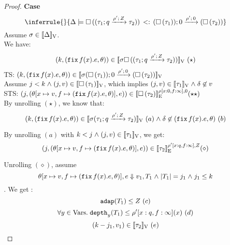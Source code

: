 \begin{proof}



\textbf{Case}
\[
\inferrule{
    }{
       \Delta \models \sub{\tbox{(
          \tarr{\type_1}{\type_2}{\nnatbiA}{\dmap'}{\nnatA} )} 
      }{\tarr{(\tbox{\type_1}) }{(\tbox{\type_2})}{0}{\dmap'}{0} }
    }
\]
Assume $ \ienv \in \lrv{\Delta}$.\\
We have:  $$ (\stepiA, (\efix f(x).\expr, \env) ) \in \lrv{\ienv \tbox{(
          \tarr{\type_1}{\type_2}{\nnatbiA}{\dmap'}{\nnatA} )} }
      ~(\star)$$
TS: $ (\stepiA, (\efix f(x).\expr, \env) ) \in \lrv{ \ienv 
  \tarr{(\tbox{\type_1}) }{(\tbox{\type_2})}{0}{\dmap'}{0}} $ \\
Assume $\stepiB < \stepiA \conj (j, \valr) \in \lrv{\tbox{\type_1}}$,
which implies $ (j, \valr) \in \lrv{\type_1} \conj \delta \not \in \valr$ \\
STS: $(\stepiB, (\env[x \mapsto \valr, f \mapsto (\efix f(x).\expr,
\env)], \expr)) \in \lre{\dmap[x: 0, f:
  \infty]}{0}{ \tbox{ \type_2} } (\star\star)$\\

By unrolling $(\star)$, we know that: 
 $$ (\stepiA, (\efix f(x).\expr, \env) ) \in \lrv{\ienv (
          \tarr{\type_1}{\type_2}{\nnatbiA}{\dmap'}{\nnatA} ) } ~(a) \conj
        \delta \not \in   (\efix f(x).\expr, \env) ~(b)
      $$

By unrolling $(a)$ with $\stepiA < \stepiB \conj (j, \valr) \in
\lrv{\type_1}$, we get:
 \[
(\stepiB, (\env[x \mapsto \valr, f \mapsto (\efix f(x).\expr,
\env)], \expr)) \in \lre{\dmap'[x: \nnatbiA, f:
  \infty]}{\nnatA}{  \type_2 } (\diamond)
\]

Unrolling $(\diamond)$, assume \[ \env[x \mapsto \valr, f \mapsto (\efix f(x).\expr,
\env)], \expr \bigstep \valr_1, \tr_1 \conj |\tr_1| = \stepiB_1 \conj
\stepiB_1 \leq \stepiA \] .
We get : $$ \adap(\tr_1) \leq \nnatA ~(c)$$
         $$\forall y \in \mbox{Vars}.\eapp  \ddep{y}(\tr_1) \leq
         \dmap'[x: \nnatbiA, f: \infty](x) ~(d)$$
         $$  (\stepiA - \stepiB_1,  \valr_1) \in \lrv{\type_2}~(e) $$


\end{proof}
